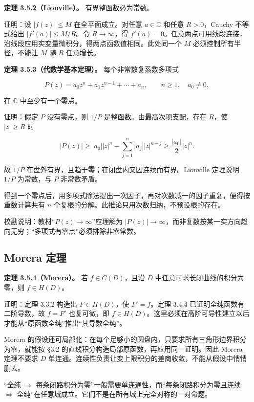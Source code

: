 \documentclass[11pt,a4paper]{article}
\begin{document}
\textbf{定理 3.5.2（Liouville）。} 有界整函数必为常数。

证明：设 \(|f(z)|\le M\) 在全平面成立。对任意 \(a\in\mathbb C\) 和任意
\(R>0\)，Cauchy 不等式给出 \(|f'(a)|\le M/R\)。令 \(R\to\infty\)，得
\(f'(a)=0\)。任意两点可用线段连接，沿线段应用实变量微积分，得两点函数值相同。此处同一个
\(M\) 必须控制所有半径，不能让 \(M\) 随 \(R\) 任意增长。

\textbf{定理 3.5.3（代数学基本定理）。} 每个非常数复系数多项式

\[
P(z)=a_0z^n+a_1z^{n-1}+\cdots+a_n,
\qquad n\ge1,\quad a_0\ne0,
\]

在 \(\mathbb C\) 中至少有一个零点。

证明：假定 \(P\) 没有零点，则 \(1/P\) 是整函数。由最高次项支配，存在
\(R\)，使 \(|z|\ge R\) 时

\[
|P(z)|\ge |a_0||z|^n-\sum_{j=1}^n|a_j||z|^{n-j}
\ge\frac{|a_0|}{2}|z|^n.
\]

故 \(1/P\) 在盘外有界，且趋于零；在闭盘内又因连续而有界。Liouville
定理说明 \(1/P\) 为常数，与 \(P\) 非常数矛盾。

得到一个零点后，用多项式除法提出一次因子，再对次数减一的因子重复，便得按重数计算共有
\(n\) 个复根的分解。此推论只用次数归纳，不预设根的存在。

校勘说明：教材``\(P(z)\to\infty\)''应理解为
\(|P(z)|\to\infty\)，而非复数按某一实方向趋向无穷；``多项式有零点''必须排除非零常数。

\subsection{Morera 定理}\label{ch03-s5-morera-ux5b9aux7406}

\textbf{定理 3.5.4（Morera）。} 若 \(f\in C(D)\)，且沿 \(D\)
中任意可求长闭曲线的积分为零，则 \(f\in H(D)\)。

证明：定理 3.3.2 构造出 \(F\in H(D)\)，使 \(F'=f\)。定理 3.4.4
已证明全纯函数有二阶导数，故 \(f=F'\) 也复可微，即
\(f\in H(D)\)。这里必须在高阶可导性建立以后才能从``原函数全纯''推出``其导数全纯''。

Morera
的假设还可局部化：在每个足够小的圆盘内，只要求所有三角形边界积分为零，就能按
§3.2 的直线积分构造局部原函数，再应用同一证明。因此 Morera 定理不要求
\(D\) 单连通。连续性负责让变上限积分的差商收敛，不能从假设中悄悄删去。

``全纯 \(\Rightarrow\)
每条闭路积分为零''一般需要单连通性，而``每条闭路积分为零且连续
\(\Rightarrow\)
全纯''在任意域成立。它们不是在所有域上完全对称的一对命题。
\end{document}

